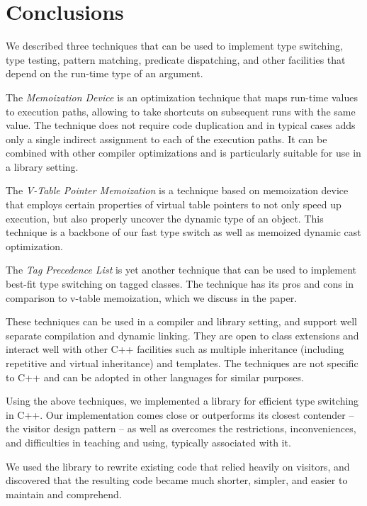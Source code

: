 \section{Conclusions} %
\label{sec:cc}

We described three techniques that can be used to implement type switching, type 
testing, pattern matching, predicate dispatching, and other facilities that 
depend on the run-time type of an argument.

The \emph{Memoization Device} is an optimization technique that maps run-time values 
to execution paths, allowing to take shortcuts on subsequent runs with the same 
value. The technique does not require code duplication and in typical cases adds 
only a single indirect assignment to each of the execution paths. It can be 
combined with other compiler optimizations and is particularly suitable for use 
in a library setting.

The \emph{V-Table Pointer Memoization} is a technique based on memoization device that 
employs certain properties of virtual table pointers to not only speed up 
execution, but also properly uncover the dynamic type of an object. This technique 
is a backbone of our fast type switch as well as memoized dynamic cast 
optimization.

The \emph{Tag Precedence List} is yet another technique that can be used to 
implement best-fit type switching on tagged classes. The technique has its pros 
and cons in comparison to v-table memoization, which we discuss in the paper.

These techniques can be used in a compiler and library setting, and support well 
separate compilation and dynamic linking. They are open to class extensions and 
interact well with other C++ facilities such as multiple inheritance (including 
repetitive and virtual inheritance) and templates. The techniques are not 
specific to C++ and can be adopted in other languages for similar purposes.

Using the above techniques, we implemented a library for efficient type switching 
in C++. Our implementation comes close or outperforms its closest contender -- 
the visitor design pattern -- as well as overcomes the restrictions, inconveniences, and 
difficulties in teaching and using, typically associated with it.

We used the library to rewrite existing code that relied heavily on 
visitors, and discovered that the resulting code became much shorter, simpler, and easier 
to maintain and comprehend.
